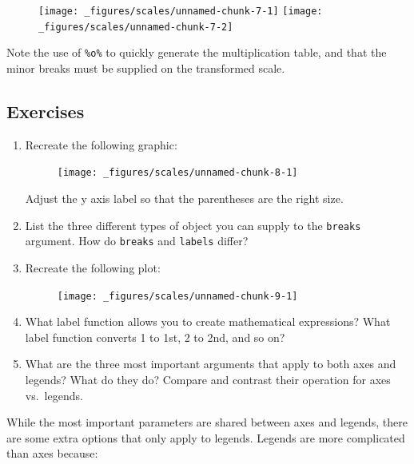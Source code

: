 \begin{figure}[H]
  \texttt{[image: \_figures/scales/unnamed-chunk-7-1]}%
  \texttt{[image: \_figures/scales/unnamed-chunk-7-2]}
\end{figure}

Note the use of \texttt{\%o\%} to quickly generate the multiplication
table, and that the minor breaks must be supplied on the transformed
scale. 

\subsection{Exercises}

\begin{enumerate}
\def\labelenumi{\arabic{enumi}.}
\item
  Recreate the following graphic:

  \begin{figure}[H]
    \texttt{[image: \_figures/scales/unnamed-chunk-8-1]}
  \end{figure}

  Adjust the y axis label so that the parentheses are the right size.
\item
  List the three different types of object you can supply to the
  \texttt{breaks} argument. How do \texttt{breaks} and \texttt{labels}
  differ?
\item
  Recreate the following plot:

  \begin{figure}[H]
    \texttt{[image: \_figures/scales/unnamed-chunk-9-1]}
  \end{figure}
\item
  What label function allows you to create mathematical expressions?
  What label function converts 1 to 1st, 2 to 2nd, and so on?
\item
  What are the three most important arguments that apply to both axes
  and legends? What do they do? Compare and contrast their operation for
  axes vs.~legends.
\end{enumerate}


While the most important parameters are shared between axes and legends,
there are some extra options that only apply to legends. Legends are
more complicated than axes because: 


